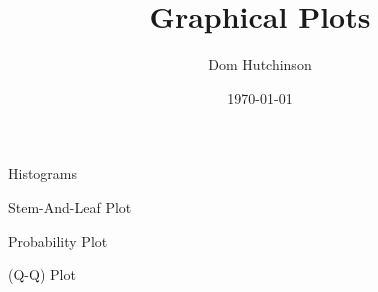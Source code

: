 \documentclass[11pt,a4paper]{article}
\begin{document}
\title{Graphical Plots}
\author{Dom Hutchinson}
\date{\today}
\maketitle

\begin{definition}{Histograms}

\end{definition}

\begin{definition}{Stem-And-Leaf Plot}

\end{definition}

\begin{definition}{Probability Plot}

\end{definition}

\begin{definition}{(Q-Q) Plot}

\end{definition}
\end{document}
